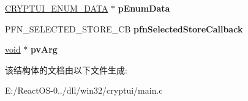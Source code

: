 \begin{DoxyCompactItemize}
\hyperlink{struct___c_r_y_p_t_u_i___e_n_u_m___d_a_t_a}{C\+R\+Y\+P\+T\+U\+I\+\_\+\+E\+N\+U\+M\+\_\+\+D\+A\+TA} $\ast$ {\bfseries p\+Enum\+Data}
\item 
\mbox{\label{struct___c_r_y_p_t_u_i___s_e_l_e_c_t_s_t_o_r_e___i_n_f_o___a_a3d969224ec2ba4433a7630362c98ff1b}} 
P\+F\+N\+\_\+\+S\+E\+L\+E\+C\+T\+E\+D\+\_\+\+S\+T\+O\+R\+E\+\_\+\+CB {\bfseries pfn\+Selected\+Store\+Callback}
\item 
\mbox{\label{struct___c_r_y_p_t_u_i___s_e_l_e_c_t_s_t_o_r_e___i_n_f_o___a_a00371738a5fb33bff31331ebc707f7a7}} 
\hyperlink{interfacevoid}{void} $\ast$ {\bfseries pv\+Arg}
\end{DoxyCompactItemize}


该结构体的文档由以下文件生成\+:\begin{DoxyCompactItemize}
\item 
E\+:/\+React\+O\+S-\/0../dll/win32/cryptui/main.\+c\end{DoxyCompactItemize}
